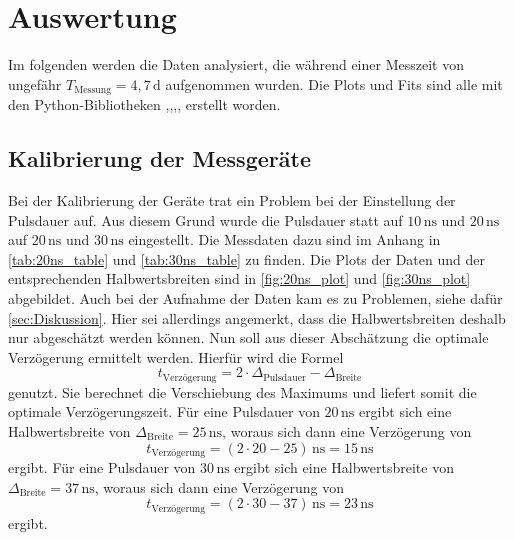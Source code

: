 \section{Auswertung}
\label{sec:Auswertung}

Im folgenden werden die Daten analysiert, die während einer Messzeit von ungefähr $T_\text{Messung} = 4,7  \, \unit\day$ aufgenommen wurden.
Die Plots und Fits sind alle mit den Python-Bibliotheken \cite{matplotlib},\cite{numpy},\cite{scipy},\cite{uncertainties},\cite{reback2020pandas} erstellt worden.
\subsection{Kalibrierung der Messgeräte}

Bei der Kalibrierung der Geräte trat ein Problem bei der Einstellung der Pulsdauer auf.
Aus diesem Grund wurde die Pulsdauer statt auf $10 \, \unit{\nano\second}$ und $20 \, \unit{\nano\second}$ auf $20 \, \unit{\nano\second}$ und $30 \, \unit{\nano\second}$ eingestellt.
Die Messdaten dazu sind im Anhang in \autoref{tab:20ns_table} und \autoref{tab:30ns_table} zu finden.
Die Plots der Daten und der entsprechenden Halbwertsbreiten sind in \autoref{fig:20ns_plot} und \autoref{fig:30ns_plot} abgebildet.
Auch bei der Aufnahme der Daten kam es zu Problemen, siehe dafür \autoref{sec:Diskussion}.
Hier sei allerdings angemerkt, dass die Halbwertsbreiten deshalb nur abgeschätzt werden können.
Nun soll aus dieser Abschätzung die optimale Verzögerung ermittelt werden.
Hierfür wird die Formel
\begin{equation*}
    t_\text{Verzögerung} = 2 \cdot \Delta_\text{Pulsdauer} - \Delta_\text{Breite}
\end{equation*}
genutzt. Sie berechnet die Verschiebung des Maximums und liefert somit die optimale Verzögerungszeit.
Für eine Pulsdauer von $20 \, \unit{\nano\second}$ ergibt sich eine Halbwertsbreite von $\Delta_\text{Breite} = 25 \, \unit{\nano\second}$, woraus sich dann eine Verzögerung von
\begin{equation*}
    t_\text{Verzögerung} = (2 \cdot 20 - 25) \, \unit{\nano\second} = 15 \, \unit{\nano\second}
\end{equation*}
ergibt.
Für eine Pulsdauer von $30 \, \unit{\nano\second}$ ergibt sich eine Halbwertsbreite von $\Delta_\text{Breite} = 37 \, \unit{\nano\second}$, woraus sich dann eine Verzögerung von
\begin{equation*}
    t_\text{Verzögerung} = (2 \cdot 30 - 37) \, \unit{\nano\second} = 23 \, \unit{\nano\second}
\end{equation*}
ergibt.

